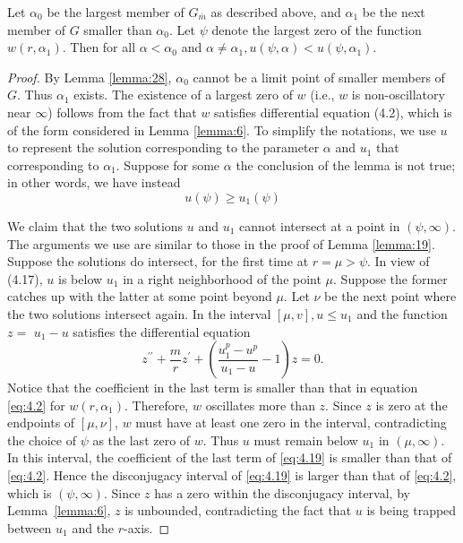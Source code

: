 \begin{lemma}\label{lemma:31}
  Let $\alpha_0$ be the largest member of $G_{\bar{m}}$ as described above, and $\alpha_1$ be the next member of $G$ smaller than $\alpha_0$. Let $\psi$ denote the largest zero of the function $w\left(r, \alpha_1\right)$. Then for all $\alpha<\alpha_0$ and $\alpha \neq \alpha_1, u(\psi, \alpha)<u\left(\psi, \alpha_1\right)$.
\end{lemma}

\begin{proof}
  By Lemma \ref{lemma:28}, $\alpha_0$ cannot be a limit point of smaller members of $G$. Thus $\alpha_1$ exists. The existence of a largest zero of $w$ (i.e., $w$ is non-oscillatory near $\infty$) follows from the fact that $w$ satisfies differential equation (4.2), which is of the form considered in Lemma \ref{lemma:6}. To simplify the notations, we use $u$ to represent the solution corresponding to the parameter $\alpha$ and $u_1$ that corresponding to $\alpha_1$. Suppose for some $\alpha$ the conclusion of the lemma is not true; in other words, we have instead
  \begin{equation}\label{eq:4.17}
    u(\psi) \geq u_1(\psi)
  \end{equation}

  We claim that the two solutions $u$ and $u_1$ cannot intersect at a point 
  in $(\psi, \infty)$. The arguments we use are similar to those in the proof of Lemma \ref{lemma:19}. 
  Suppose the solutions do intersect, for the first time at $r=\mu>\psi$.
  In view of (4.17), $u$ is below $u_1$ in a right neighborhood of the point $\mu$.
  Suppose the former catches up with the latter at some point beyond $\mu$.
  Let $\nu$ be the next point where the two solutions intersect again.
  In the interval $[\mu, v], u \leq u_1$ and the function $z=$ $u_1-u$ satisfies the 
  differential equation
  \begin{equation}\label{eq:4.18}
    z^{\prime \prime}+\frac{m}{r} z^{\prime}+\left(\frac{u_1^p-u^p}{u_1-u}-1\right) z=0.
  \end{equation}
  Notice that the coefficient in the last term is smaller than that in equation \eqref{eq:4.2}
  for $w\left(r, \alpha_1\right)$. Therefore, $w$ oscillates more than $z$.
  Since $z$ is zero at the endpoints of $[\mu, \nu]$, $w$ must have at least one zero in the 
  interval, contradicting the choice of $\psi$ as the last zero of $w$.
  Thus $u$ must remain below $u_1$ in $(\mu, \infty)$. In this interval,
  the coefficient of the last term of \eqref{eq:4.19} is smaller than that of \eqref{eq:4.2}.
  Hence the disconjugacy interval of \eqref{eq:4.19} is larger than that of \eqref{eq:4.2},
  which is $(\psi, \infty)$. Since $z$ has a zero within the disconjugacy interval,
  by Lemma~\ref{lemma:6}, $z$ is unbounded, contradicting the fact that $u$ is being trapped 
  between $u_1$ and the $r$-axis.


\end{proof}
